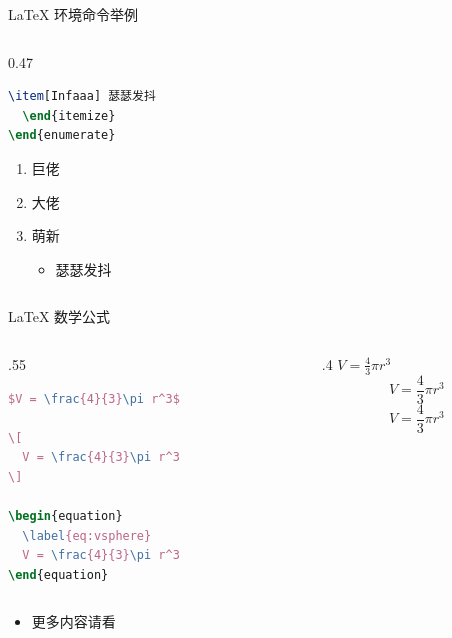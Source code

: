 \documentclass[aspectratio=169]{beamer}
\begin{document}
\begin{frame}[fragile]{\LaTeX{} 环境命令举例}
\begin{columns}[T,onlytextwidth]
\begin{column}{0.47\textwidth}
\begin{lstlisting}[language=TeX,basicstyle=\ttfamily\footnotesize]
    \item[Infaaa] 瑟瑟发抖
  \end{itemize}
\end{enumerate}
\end{lstlisting}
        \medskip
        \begin{enumerate}
            \item 巨佬
            \item 大佬
            \item 萌新
            \begin{itemize}
                \item[Infaaa] 瑟瑟发抖
            \end{itemize}
        \end{enumerate}
    \end{column}
    \end{columns}
\end{frame}

\begin{frame}[fragile]{\LaTeX{} 数学公式}
    \begin{columns}[c,onlytextwidth]
        \begin{column}{.55\textwidth}
\begin{lstlisting}[language=TeX]
$V = \frac{4}{3}\pi r^3$

\[
  V = \frac{4}{3}\pi r^3
\]

\begin{equation}
  \label{eq:vsphere}
  V = \frac{4}{3}\pi r^3
\end{equation}
\end{lstlisting}
        \end{column}
        \begin{column}{.4\textwidth}
            $V = \frac{4}{3}\pi r^3$
            \[
                V = \frac{4}{3}\pi r^3
            \]
            \begin{equation}
                \label{eq:vsphere}
                V = \frac{4}{3}\pi r^3
            \end{equation}
        \end{column}
    \end{columns}
    \begin{itemize}
        \item 更多内容请看 \href{https://zh.wikipedia.org/wiki/Help:数学公式}{\color{purple}{这里}}
    \end{itemize}
\end{frame}
\end{document}
